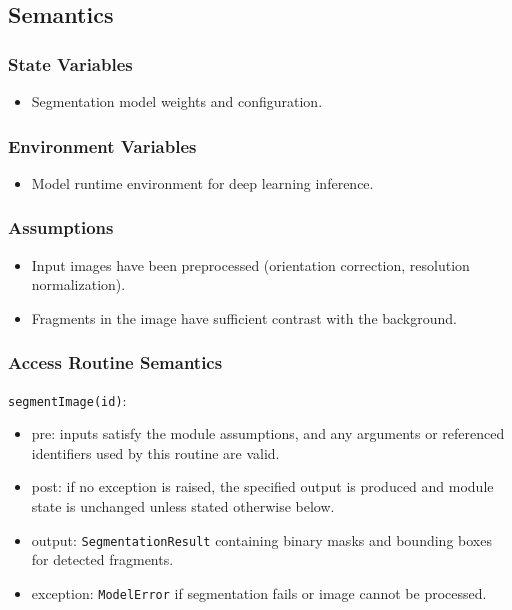 \documentclass[12pt, titlepage]{article}
\begin{document}
\subsection{Semantics}

\subsubsection{State Variables}
\begin{itemize}
    \item Segmentation model weights and configuration.
\end{itemize}

\subsubsection{Environment Variables}
\begin{itemize}
    \item Model runtime environment for deep learning inference.
\end{itemize}

\subsubsection{Assumptions}
\begin{itemize}
    \item Input images have been preprocessed (orientation correction, resolution normalization).
    \item Fragments in the image have sufficient contrast with the background.
\end{itemize}

\subsubsection{Access Routine Semantics}

\noindent \texttt{segmentImage(id)}:
\begin{itemize}
    \item pre: inputs satisfy the module assumptions, and any arguments or referenced identifiers used by this routine are valid.
    \item post: if no exception is raised, the specified output is produced and module state is unchanged unless stated otherwise below.
    \item output: \texttt{SegmentationResult} containing binary masks and bounding boxes for detected fragments.
    \item exception: \texttt{ModelError} if segmentation fails or image cannot be processed.
\end{itemize}
\end{document}
